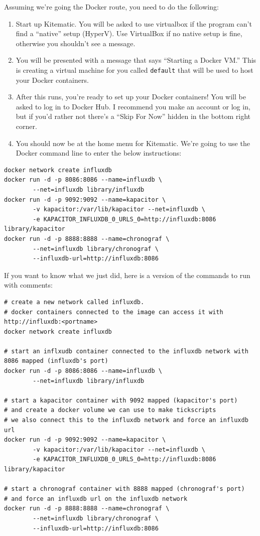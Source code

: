 Assuming we're going the Docker route, you need to do the following:

\begin{enumerate}
\def\labelenumi{\arabic{enumi}.}
\tightlist
\item
  Start up Kitematic. You will be asked to use virtualbox if the program
  can't find a ``native'' setup (HyperV). Use VirtualBox if no native
  setup is fine, otherwise you shouldn't see a message.
\item
  You will be presented with a message that says ``Starting a Docker
  VM.'' This is creating a virtual machine for you called
  \texttt{default} that will be used to host your Docker containers.
\item
  After this runs, you're ready to set up your Docker containers! You
  will be asked to log in to Docker Hub. I recommend you make an account
  or log in, but if you'd rather not there's a ``Skip For Now'' hidden
  in the bottom right corner.
\item
  You should now be at the home menu for Kitematic. We're going to use
  the Docker command line to enter the below instructions:
\end{enumerate}

\begin{verbatim}
docker network create influxdb
docker run -d -p 8086:8086 --name=influxdb \
        --net=influxdb library/influxdb
docker run -d -p 9092:9092 --name=kapacitor \
        -v kapacitor:/var/lib/kapacitor --net=influxdb \ 
        -e KAPACITOR_INFLUXDB_0_URLS_0=http://influxdb:8086 library/kapacitor
docker run -d -p 8888:8888 --name=chronograf \
        --net=influxdb library/chronograf \
        --influxdb-url=http://influxdb:8086
\end{verbatim}

If you want to know what we just did, here is a version of the commands
to run with comments:

\begin{verbatim}
# create a new network called influxdb.
# docker containers connected to the image can access it with http://influxdb:<portname>
docker network create influxdb

# start an inflxudb container connected to the influxdb network with 8086 mapped (influxdb's port)
docker run -d -p 8086:8086 --name=influxdb \
        --net=influxdb library/influxdb

# start a kapacitor container with 9092 mapped (kapacitor's port)
# and create a docker volume we can use to make tickscripts
# we also connect this to the influxdb network and force an influxdb url
docker run -d -p 9092:9092 --name=kapacitor \
        -v kapacitor:/var/lib/kapacitor --net=influxdb \
        -e KAPACITOR_INFLUXDB_0_URLS_0=http://influxdb:8086 library/kapacitor

# start a chronograf container with 8888 mapped (chronograf's port)
# and force an influxdb url on the influxdb network
docker run -d -p 8888:8888 --name=chronograf \
        --net=influxdb library/chronograf \
        --influxdb-url=http://influxdb:8086
\end{verbatim}

